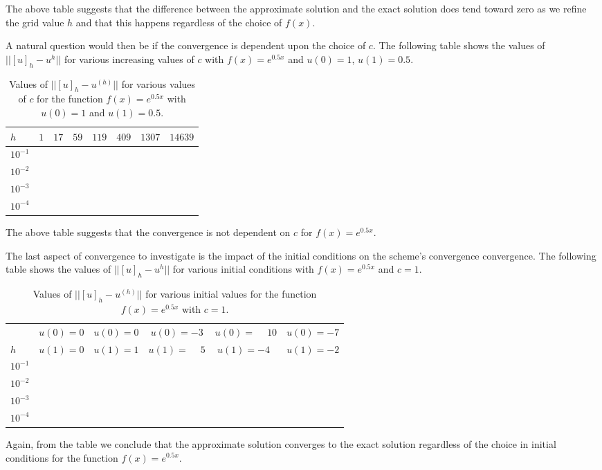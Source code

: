 The above table suggests that the difference between the approximate solution
and the exact solution does tend toward zero as we refine the grid value $h$ and
that this happens regardless of the choice of $f(x)$.

A natural question would then be if the convergence is dependent upon the choice
of $c$. The following table shows the values of $||[u]_h - u^{h}||$ for various
increasing values of $c$ with $f(x) = e^{0.5x}$ and $u(0) = 1$, $u(1) = 0.5$.

\begin{table}[h!]
  \centering
  \bgroup
  \def\arraystretch{1.5}
  \begin{tabular}{| l | c | c | c | c | c | c | c |}
    \hline
    $h$ & $1$ & $17$ & $59$ & $119$ & $409$ & $1307$ & $14639$\\
    \hline
    $10^{-1}$ & & & & & & & \\
    $10^{-2}$ & & & & & & & \\
    $10^{-3}$ & & & & & & & \\
    $10^{-4}$ & & & & & & & \\
    \hline
  \end{tabular}
  \egroup
  \caption{Values of $||[u]_h - u^{(h)}||$ for various values of $c$ for the function $f(x) = e^{0.5x}$ with $u(0) = 1$ and $u(1) = 0.5$.}
\end{table}

The above table suggests that the convergence is not dependent on $c$ for $f(x) = e^{0.5x}$.

The last aspect of convergence to investigate is the impact of the initial conditions
on the scheme's convergence convergence. The following table shows the values of $||[u]_h - u^{h}||$ for various
initial conditions with $f(x) = e^{0.5x}$ and $c=1$.

\begin{table}[h!]
  \centering
  \bgroup
  \def\arraystretch{1.5}
  \begin{tabular}{| l | c | c | c | c | c |}
    \hline
    & $u(0) = 0$ & $u(0) = 0$ & $u(0) = -3$ & $u(0) = \phantom{-}10$ & $u(0) = -7$ \\
    $h$ &  $u(1) = 0$ & $u(1) = 1$ & $u(1) = \phantom{-}5$ & $u(1) = -4\phantom{0}$ & $u(1) = -2$\\
    \hline
    $10^{-1}$ & & & & & \\
    $10^{-2}$ & & & & & \\
    $10^{-3}$ & & & & & \\
    $10^{-4}$ & & & & & \\
    \hline
  \end{tabular}
  \egroup
  \caption{Values of $||[u]_h - u^{(h)}||$ for various initial values for the function $f(x) = e^{0.5x}$ with $c=1$.}
\end{table}

Again, from the table we conclude that the approximate solution converges to the
exact solution regardless of the choice in initial conditions for the function
$f(x) = e^{0.5x}$.